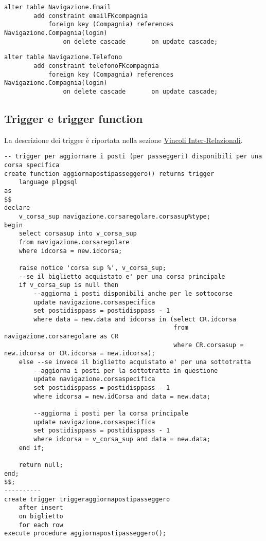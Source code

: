 \begin{lstlisting}[style=sqlstyle, title = {Aggiunto vincolo di chiave esterna per la tabella Email}]
    alter table Navigazione.Email
        add constraint emailFKcompagnia
            foreign key (Compagnia) references Navigazione.Compagnia(login)
                on delete cascade       on update cascade;
\end{lstlisting}

\begin{lstlisting}[style=sqlstyle, title = {Aggiunto vincolo di chiave esterna per la tabella Telefono}]
    alter table Navigazione.Telefono
        add constraint telefonoFKcompagnia
            foreign key (Compagnia) references Navigazione.Compagnia(login)
                on delete cascade       on update cascade;
\end{lstlisting}

\subsection{Trigger e trigger function}
\label{sec:ImplementazioneTrigger}
La descrizione dei trigger è riportata nella sezione \hyperref[sec:VincoliInterRelazionali]{Vincoli Inter-Relazionali}.

\begin{lstlisting}[style=sqlstyle]
-- trigger per aggiornare i posti (per passeggeri) disponibili per una corsa specifica
create function aggiornapostipasseggero() returns trigger
    language plpgsql
as
$$
declare
    v_corsa_sup navigazione.corsaregolare.corsasup%type;
begin
    select corsasup into v_corsa_sup
    from navigazione.corsaregolare
    where idcorsa = new.idcorsa;

    raise notice 'corsa sup %', v_corsa_sup;
    --se il biglietto acquistato e' per una corsa principale 
    if v_corsa_sup is null then 
        --aggiorna i posti disponibili anche per le sottocorse
        update navigazione.corsaspecifica
        set postidisppass = postidisppass - 1
        where data = new.data and idcorsa in (select CR.idcorsa
                                              from navigazione.corsaregolare as CR
                                              where CR.corsasup = new.idcorsa or CR.idcorsa = new.idcorsa);
    else --se invece il biglietto acquistato e' per una sottotratta 
        --aggiorna i posti per la sottotratta in questione
        update navigazione.corsaspecifica
        set postidisppass = postidisppass - 1
        where idcorsa = new.idCorsa and data = new.data;
        
        --aggiorna i posti per la corsa principale
        update navigazione.corsaspecifica
        set postidisppass = postidisppass - 1
        where idcorsa = v_corsa_sup and data = new.data;
    end if;
    
    return null;
end;
$$;
----------
create trigger triggeraggiornapostipasseggero
    after insert
    on biglietto
    for each row
execute procedure aggiornapostipasseggero();
\end{lstlisting}


